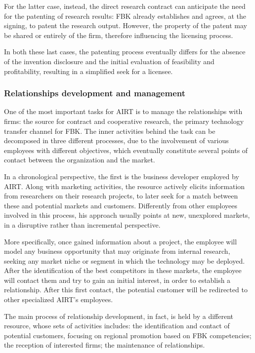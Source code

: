 For the latter case, instead, the direct research contract can anticipate the need for the patenting of research results: FBK already establishes and agrees, at the signing, to patent the research output. However, the property of the patent may be shared or entirely of the firm, therefore influencing the licensing process.

In both these last cases, the patenting process eventually differs for the absence of the invention disclosure and the initial evaluation of feasibility and profitability, resulting in a simplified seek for a licensee.

\subsubsection{Relationships development and management}

One of the most important tasks for AIRT is to manage the relationships with firms: the source for contract and cooperative research, the primary technology transfer channel for FBK. The inner activities behind the task can be decomposed in three different processes, due to the involvement of various employees with different objectives, which eventually constitute several points of contact between the organization and the market.

In a chronological perspective, the first is the business developer employed by AIRT. Along with marketing activities, the resource actively elicits information from researchers on their research projects, to later seek for a match between these and potential markets and customers. Differently from other employees involved in this process, his approach usually points at new, unexplored markets, in a disruptive rather than incremental perspective. 

More specifically, once gained information about a project, the employee will model any business opportunity that may originate from internal research, seeking any market niche or segment in which the technology may be deployed. After the identification of the best competitors in these markets, the employee will contact them and try to gain an initial interest, in order to establish a relationship. After this first contact, the potential customer will be redirected to other specialized AIRT's employees. 

The main process of relationship development, in fact, is held by a different resource, whose sets of activities includes: the identification and contact of potential customers, focusing on regional promotion based on FBK competencies; the reception of interested firms; the maintenance of relationships. 

